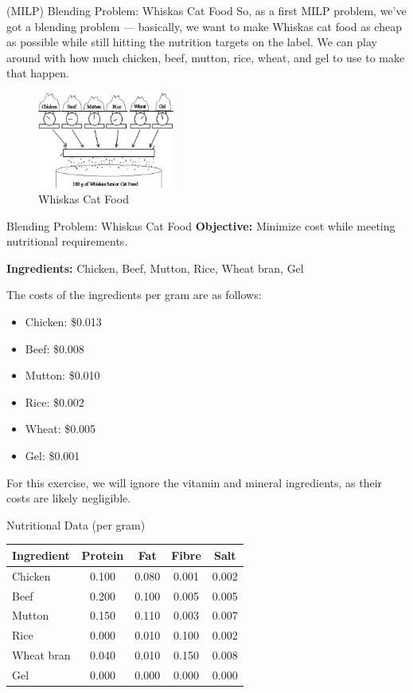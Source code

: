 \documentclass{purdue-slide}
\begin{document}
\begin{frame}{(MILP) Blending Problem: Whiskas Cat Food}
	So, as a first MILP problem, we've
	got a blending problem —
	basically, we want to make
	Whiskas cat food as cheap as
	possible while still hitting the
	nutrition targets on the label. We
	can play around with how much
	chicken, beef, mutton, rice, wheat,
	and gel to use to make that
	happen.

	\begin{figure}[H]
		\centering
		\includegraphics[width=0.4\textwidth]{pics/whiskas_blend_intro.jpg}
		\caption{Whiskas Cat Food}
	\end{figure}
\end{frame}

\begin{frame}{Blending Problem: Whiskas Cat Food}
	\textbf{Objective:} Minimize cost while meeting nutritional requirements.

	\bigskip

	\textbf{Ingredients:} Chicken, Beef, Mutton, Rice, Wheat bran, Gel

	\bigskip

	The costs of the ingredients per gram are as follows:
	\begin{itemize}
		\item Chicken: \$0.013
		\item Beef: \$0.008
		\item Mutton: \$0.010
		\item Rice: \$0.002
		\item Wheat: \$0.005
		\item Gel: \$0.001
	\end{itemize}

	For this exercise, we will ignore the vitamin and mineral ingredients, as their costs are likely negligible.
\end{frame}

\begin{frame}{Nutritional Data (per gram)}
	\centering
	\begin{tabular}{lcccc}
		\toprule
		Ingredient & Protein & Fat & Fibre & Salt \\
		\midrule
		Chicken     & 0.100 & 0.080 & 0.001 & 0.002 \\
		Beef        & 0.200 & 0.100 & 0.005 & 0.005 \\
		Mutton      & 0.150 & 0.110 & 0.003 & 0.007 \\
		Rice        & 0.000 & 0.010 & 0.100 & 0.002 \\
		Wheat bran  & 0.040 & 0.010 & 0.150 & 0.008 \\
		Gel         & 0.000 & 0.000 & 0.000 & 0.000 \\
		\bottomrule
	\end{tabular}
\end{frame}
\end{document}
